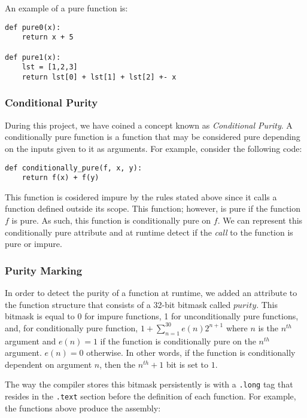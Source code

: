 \documentclass{acm_proc_article-sp}
\begin{document}
An example of a pure function is:

\begin{verbatim}
def pure0(x):
    return x + 5

def pure1(x):
    lst = [1,2,3]
    return lst[0] + lst[1] + lst[2] +- x
\end{verbatim}

\subsubsection*{Conditional Purity}

During this project, we have coined a concept known as \emph{Conditional
Purity}. A conditionally pure function is a function that may be considered
pure depending on the inputs given to it as arguments. For example, consider
the following code:


\begin{verbatim}
def conditionally_pure(f, x, y):
    return f(x) + f(y)
\end{verbatim}

This function is cosidered impure by the rules stated above since it calls a function defined outside
its scope. This function; however, is pure if the function $f$ is pure. As such, this function is
conditionally pure on $f$. We can represent this conditionally pure attribute and at runtime detect
if the \emph{call} to the function is pure or impure.

\subsubsection*{Purity Marking}

In order to detect the purity of a function at runtime, we added an attribute to the function structure
that consists of a 32-bit bitmask called $purity$. This bitmask is equal to 0 for impure functions, 1 for unconditionally
pure functions, and, for conditionally pure function, $1 + \sum_{n=1}^{30}{e(n)2^{n+1}}$ where $n$ is the $n^{th}$
argument and $e(n)=1$ if the function is conditionally pure on the $n^{th}$ argument. $e(n)=0$ otherwise. In other
words, if the function is conditionally dependent on argument $n$, then the $n^{th} + 1$ bit is set to $1$.

The way the compiler stores this bitmask persistently is with a \verb|.long| tag that resides
in the \verb|.text| section before the definition of each function. For example, the functions
above produce the assembly:
\end{document}
